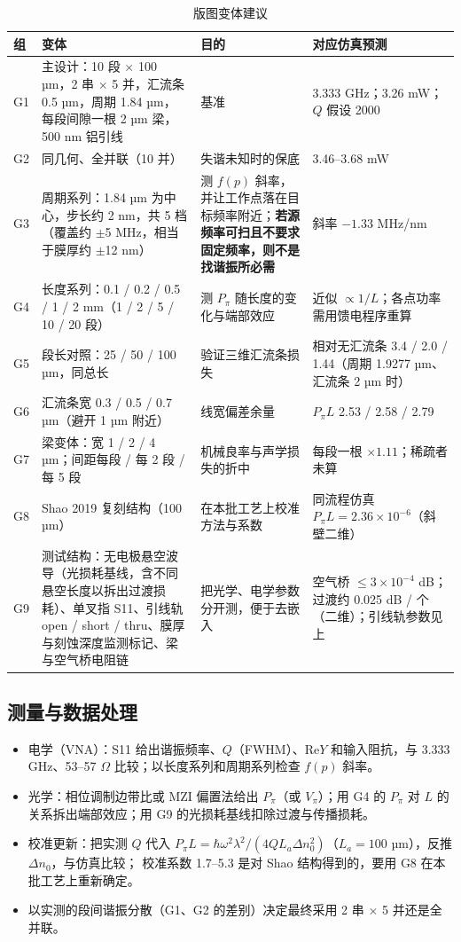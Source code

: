 \documentclass[10pt,a4paper]{article}
\newcommand{\dn}{\Delta n_0}
\begin{document}
\begin{table}[H]
\centering\footnotesize
\caption{版图变体建议}
\begin{tabular}{L{0.8cm}L{4.9cm}L{4.4cm}L{4.5cm}}
\toprule
组 & 变体 & 目的 & 对应仿真预测 \\
\midrule
G1 & 主设计：10 段 $\times$ 100 µm，2 串 $\times$ 5 并，汇流条 0.5 µm，周期 1.84 µm，每段间隙一根 2 µm 梁，500 nm 铝引线 & 基准 & 3.333 GHz；3.26 mW；$Q$ 假设 2000 \\
G2 & 同几何、全并联（10 并） & 失谐未知时的保底 & 3.46--3.68 mW \\
G3 & 周期系列：1.84 µm 为中心，步长约 2 nm，共 5 档（覆盖约 $\pm$5 MHz，相当于膜厚约 $\pm$12 nm） & 测 $f(p)$ 斜率，并让工作点落在目标频率附近；\textbf{若源频率可扫且不要求固定频率，则不是找谐振所必需} & 斜率 $-1.33$ MHz/nm \\
G4 & 长度系列：0.1 / 0.2 / 0.5 / 1 / 2 mm（1 / 2 / 5 / 10 / 20 段） & 测 $P_\pi$ 随长度的变化与端部效应 & 近似 $\propto 1/L$；各点功率需用馈电程序重算 \\
G5 & 段长对照：25 / 50 / 100 µm，同总长 & 验证三维汇流条损失 & 相对无汇流条 3.4 / 2.0 / 1.44（周期 1.9277 µm、汇流条 2 µm 时） \\
G6 & 汇流条宽 0.3 / 0.5 / 0.7 µm（避开 1 µm 附近） & 线宽偏差余量 & $P_\pi L$ 2.53 / 2.58 / 2.79 \\
G7 & 梁变体：宽 1 / 2 / 4 µm；间距每段 / 每 2 段 / 每 5 段 & 机械良率与声学损失的折中 & 每段一根 $\times1.11$；稀疏者未算 \\
G8 & Shao 2019 复刻结构（100 µm） & 在本批工艺上校准方法与系数 & 同流程仿真 $P_\pi L = 2.36\times10^{-6}$（斜壁二维） \\
G9 & 测试结构：无电极悬空波导（光损耗基线，含不同悬空长度以拆出过渡损耗）、单叉指 S11、引线轨 open / short / thru、膜厚与刻蚀深度监测标记、梁与空气桥电阻链 & 把光学、电学参数分开测，便于去嵌入 & 空气桥 $\le 3\times10^{-4}$ dB；过渡约 0.025 dB / 个（二维）；引线轨参数见上 \\
\bottomrule
\end{tabular}
\end{table}

\subsection{测量与数据处理}
\begin{itemize}
  \item 电学（VNA）：S11 给出谐振频率、$Q$（FWHM）、Re$Y$ 和输入阻抗，与 3.333 GHz、53--57 $\Omega$ 比较；以长度系列和周期系列检查 $f(p)$ 斜率。
  \item 光学：相位调制边带比或 MZI 偏置法给出 $P_\pi$（或 $V_\pi$）；用 G4 的 $P_\pi$ 对 $L$ 的关系拆出端部效应；用 G9 的光损耗基线扣除过渡与传播损耗。
  \item 校准更新：把实测 $Q$ 代入 $P_\pi L = \hbar\omega^2\lambda^2/(4QL_a\dn^2)$（$L_a = 100$ µm），反推 $\dn$，与仿真比较；
        校准系数 1.7--5.3 是对 Shao 结构得到的，要用 G8 在本批工艺上重新确定。
  \item 以实测的段间谐振分散（G1、G2 的差别）决定最终采用 2 串 $\times$ 5 并还是全并联。
\end{itemize}
\end{document}
